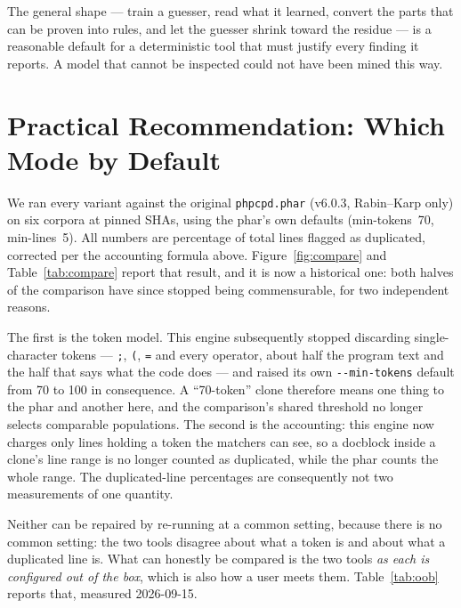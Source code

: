 \documentclass[10pt,a4paper]{article}
\begin{document}
The general shape --- train a guesser, read what it learned, convert the parts that can be proven
into rules, and let the guesser shrink toward the residue --- is a reasonable default for a
deterministic tool that must justify every finding it reports. A model that cannot be inspected
could not have been mined this way.

\section{Practical Recommendation: Which Mode by Default}
\label{sec:practical}

We ran every variant against the original \texttt{phpcpd.phar} (v6.0.3, Rabin--Karp only) on six
corpora at pinned SHAs, using the phar's own defaults (min-tokens~70, min-lines~5). All numbers are
percentage of total lines flagged as duplicated, corrected per the accounting formula above.
Figure~\ref{fig:compare} and Table~\ref{tab:compare} report that result, and it is now a historical
one: both halves of the comparison have since stopped being commensurable, for two independent
reasons.

The first is the token model. This engine subsequently stopped discarding
single-character tokens --- \texttt{;}, \texttt{(}, \texttt{=} and every operator, about half the
program text and the half that says what the code does --- and raised its own \texttt{-{}-min-tokens}
default from 70 to 100 in consequence. A ``70-token'' clone therefore means one thing to the phar and
another here, and the comparison's shared threshold no longer selects comparable populations. The
second is the accounting: this engine now charges only lines holding a token the matchers can see, so
a docblock inside a clone's line range is no longer counted as duplicated, while the phar counts the
whole range. The duplicated-line percentages are consequently not two measurements of one quantity.

Neither can be repaired by re-running at a common setting, because there is no common setting: the
two tools disagree about what a token is and about what a duplicated line is. What can honestly be
compared is the two tools \emph{as each is configured out of the box}, which is also how a user meets
them. Table~\ref{tab:oob} reports that, measured 2026-09-15.
\end{document}
